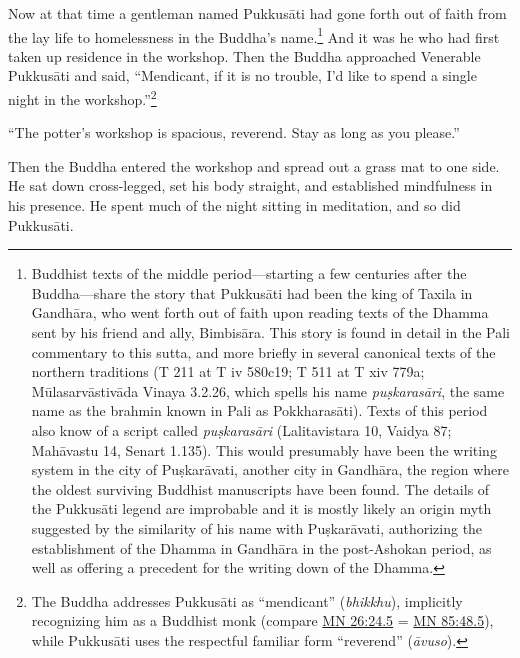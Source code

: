 \documentclass[12pt,openany]{book}%
\begin{document}
Now at that time a gentleman named \textsanskrit{Pukkusāti} had gone forth out of faith from the lay life to homelessness in the Buddha’s name.\footnote{Buddhist texts of the middle period—starting a few centuries after the Buddha—share the story that \textsanskrit{Pukkusāti} had been the king of Taxila in \textsanskrit{Gandhāra}, who went forth out of faith upon reading texts of the Dhamma sent by his friend and ally, \textsanskrit{Bimbisāra}. This story is found in detail in the Pali commentary to this sutta, and more briefly in several canonical texts of the northern traditions (T 211 at T iv 580c19; T 511 at T xiv 779a; \textsanskrit{Mūlasarvāstivāda} Vinaya 3.2.26, which spells his name \textit{\textsanskrit{puṣkarasāri}}, the same name as the brahmin known in Pali as \textsanskrit{Pokkharasāti}). Texts of this period also know of a script called \textit{\textsanskrit{puṣkarasāri}} (Lalitavistara 10, Vaidya 87; \textsanskrit{Mahāvastu} 14, Senart 1.135). This would presumably have been the writing system in the city of \textsanskrit{Puṣkarāvati}, another city in \textsanskrit{Gandhāra}, the region where the oldest surviving Buddhist manuscripts have been found. The details of the \textsanskrit{Pukkusāti} legend are improbable and it is mostly likely an origin myth suggested by the similarity of his name with \textsanskrit{Puṣkarāvati}, authorizing the establishment of the Dhamma in \textsanskrit{Gandhāra} in the post-Ashokan period, as well as offering a precedent for the writing down of the Dhamma. } And it was he who had first taken up residence in the workshop. Then the Buddha approached Venerable \textsanskrit{Pukkusāti} and said, “Mendicant, if it is no trouble, I’d like to spend a single night in the workshop.”\footnote{The Buddha addresses \textsanskrit{Pukkusāti} as “mendicant” (\textit{bhikkhu}), implicitly recognizing him as a Buddhist monk (compare \href{https://suttacentral.net/mn26/en/sujato\#24.5}{MN 26:24.5} = \href{https://suttacentral.net/mn85/en/sujato\#48.5}{MN 85:48.5}), while \textsanskrit{Pukkusāti} uses the respectful familiar form “reverend” (\textit{\textsanskrit{āvuso}}). } 

“The potter’s workshop is spacious, reverend. Stay as long as you please.” 

Then the Buddha entered the workshop and spread out a grass mat to one side. He sat down cross-legged, set his body straight, and established mindfulness in his presence. He spent much of the night sitting in meditation, and so did \textsanskrit{Pukkusāti}. 
\end{document}
